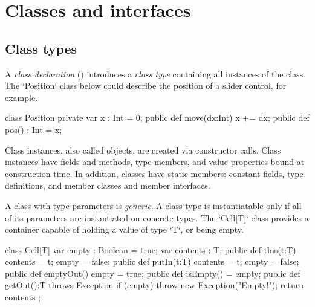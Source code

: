 


\section{Classes and interfaces}
\label{ReferenceTypes}

\subsection{Class types}


A {\em class declaration} () introduces a {\em class type}
containing all instances of the class.  The \xcd`Position` class below
could describe the position of a slider control, for example.

\begin{xten}
class Position {
  private var x : Int = 0;
  public def move(dx:Int) { x += dx; }
  public def pos() : Int = x;
}
\end{xten}
%

Class instances, also called objects, are created via constructor calls. Class
instances have fields and methods, type members, and value properties bound at
construction time. In addition, classes have static members: constant fields,
type definitions, and member classes and member interfaces.

A class with type parameters is {\em generic}. A class type is instantiatable
only if all of its parameters are instantiated on concrete types.  The
\xcd`Cell[T]` class provides a container capable of holding a value of type
\xcd`T`, or being empty.

\begin{xten}
class Cell[T] {
  var empty : Boolean = true;
  var contents : T;
  public def this(t:T) { 
     contents = t; empty = false; 
  }
  public def putIn(t:T) { 
    contents = t; empty = false; 
  }
  public def emptyOut() { empty = true; }
  public def isEmpty() = empty;
  public def getOut():T throws Exception {
     if (empty) throw new Exception("Empty!");
     return contents ;
  }
}
\end{xten}
%


